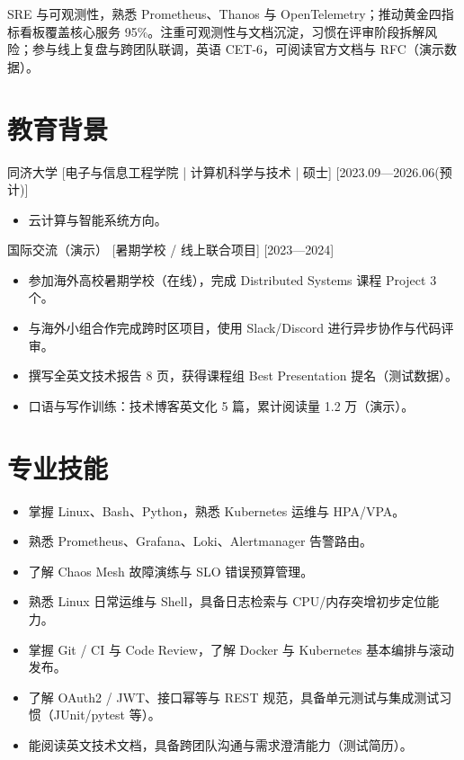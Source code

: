 \documentclass{resume-photo}
\begin{document}

\ResumeTitle

\noindent SRE 与可观测性，熟悉 Prometheus、Thanos 与 OpenTelemetry；推动黄金四指标看板覆盖核心服务 95\%。注重可观测性与文档沉淀，习惯在评审阶段拆解风险；参与线上复盘与跨团队联调，英语 CET-6，可阅读官方文档与 RFC（演示数据）。

\section{教育背景}
\ResumeItem
{同济大学}
[\textnormal{电子与信息工程学院 | 计算机科学与技术 | 硕士}]
[2023.09—2026.06(预计)]

\begin{itemize}
  \item 云计算与智能系统方向。
\end{itemize}


\ResumeItem
{国际交流（演示）}
[\textnormal{暑期学校 / 线上联合项目}]
[2023—2024]

\begin{itemize}
  \item 参加海外高校暑期学校（在线），完成 Distributed Systems 课程 Project 3 个。
  \item 与海外小组合作完成跨时区项目，使用 Slack/Discord 进行异步协作与代码评审。
  \item 撰写全英文技术报告 8 页，获得课程组 Best Presentation 提名（测试数据）。
  \item 口语与写作训练：技术博客英文化 5 篇，累计阅读量 1.2 万（演示）。
\end{itemize}



\section{专业技能}
\begin{itemize}
  \item 掌握 Linux、Bash、Python，熟悉 Kubernetes 运维与 HPA/VPA。
  \item 熟悉 Prometheus、Grafana、Loki、Alertmanager 告警路由。
  \item 了解 Chaos Mesh 故障演练与 SLO 错误预算管理。
  \item 熟悉 Linux 日常运维与 Shell，具备日志检索与 CPU/内存突增初步定位能力。
  \item 掌握 Git / CI 与 Code Review，了解 Docker 与 Kubernetes 基本编排与滚动发布。
  \item 了解 OAuth2 / JWT、接口幂等与 REST 规范，具备单元测试与集成测试习惯（JUnit/pytest 等）。
  \item 能阅读英文技术文档，具备跨团队沟通与需求澄清能力（测试简历）。
\end{itemize}
\end{document}

